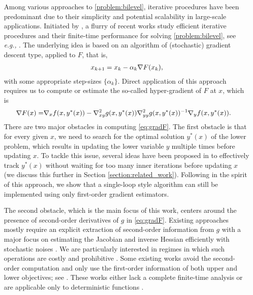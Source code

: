 Among various approaches to \eqref{problem:bilevel}, iterative procedures have been predominant due to their simplicity and potential scalability in large-scale applications. Initiated by \cite{ghadimi2018approximation}, a flurry of recent works study efficient iterative procedures and their finite-time performance for solving \eqref{problem:bilevel}, see {\it e.g.,}  \cite{chen2021closing, hong2020two, khanduri2021near, chen2022single, dagreou2022framework, guo2021randomized, sow2022constrained, ji2021bilevel, yang2021provably}. The underlying idea is based on an algorithm of (stochastic) gradient descent type, applied to $F$, that is,
\begin{align*}
    x_{k+1} = x_k - \alpha_k \nabla F(x_k),
\end{align*}
with some appropriate step-sizes $\{\alpha_k\}$. 
Direct application of this approach requires us to  compute or estimate the so-called hyper-gradient of $F$ at $x$, which is
\begin{align} \label{eq:gradF}
    \nabla F(x) = &\nabla_x f (x, y^*(x)) - 
    \nabla_{xy}^2 g(x, y^*(x))  
    \nabla_{yy}^2 g(x, y^*(x))^{-1} \nabla_y f(x, y^*(x)). 
\end{align}
There are two major obstacles in computing \eqref{eq:gradF}. 
The first obstacle is that for every given $x$, we need to search for the optimal solution $y^*(x)$ of the lower problem, which results in updating the lower variable $y$ multiple times before updating $x$. 
To tackle this issue, several ideas have been proposed in \cite{ghadimi2018approximation, hong2020two, chen2021closing} to effectively track $y^*(x)$ without waiting for too many inner iterations before updating $x$ (we discuss this further in Section \ref{section:related_work}).
Following in the spirit of this approach, we show that a single-loop style algorithm can still be implemented using only first-order gradient estimators. 

The second obstacle, which is the main focus of this work, centers around the presence of second-order derivatives of $g$ in \eqref{eq:gradF}.
Existing approaches mostly require an explicit extraction of second-order information from $g$ with a major focus on estimating the Jacobian and inverse Hessian efficiently with stochastic noises \cite{ji2021bilevel, chen2022single, dagreou2022framework}. 
We are particularly interested  in regimes in which such operations are costly and prohibitive \cite{mehra2021penalty, giovannelli2021bilevel}. 
Some existing works avoid the second-order computation and only use the first-order information of both upper and lower objectives; see \cite{giovannelli2021bilevel, sow2022constrained, liu2021towards, ye2022bome}. 
These works either lack a complete finite-time analysis \cite{giovannelli2021bilevel, liu2021towards} or are applicable only to deterministic functions \cite{ye2022bome, sow2022constrained}. 


